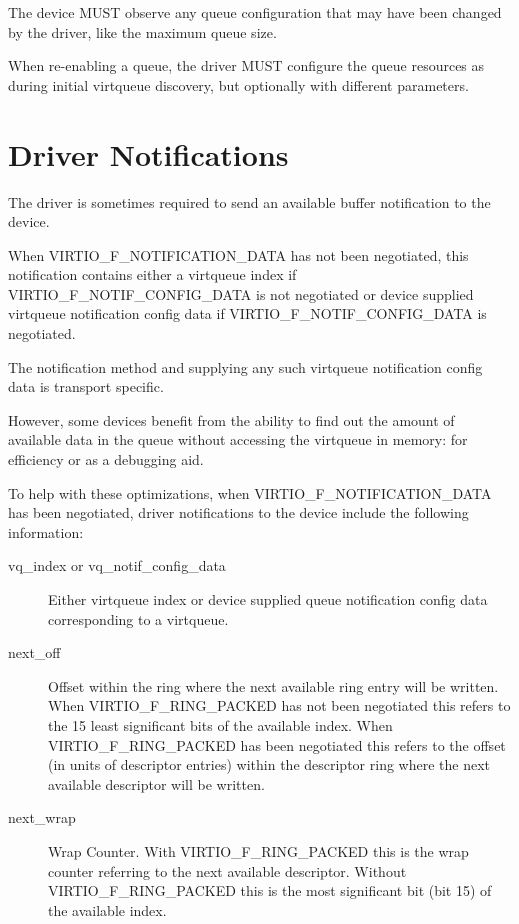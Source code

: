 The device MUST observe any queue configuration that may have been
changed by the driver, like the maximum queue size.


When re-enabling a queue, the driver MUST configure the queue resources
as during initial virtqueue discovery, but optionally with different
parameters.





\section{Driver Notifications} \label{sec:Basic Facilities of a Virtio Device / Driver notifications}
The driver is sometimes required to send an available buffer
notification to the device.

When VIRTIO_F_NOTIFICATION_DATA has not been negotiated,
this notification contains either a virtqueue index if
VIRTIO_F_NOTIF_CONFIG_DATA is not negotiated or device supplied virtqueue
notification config data if VIRTIO_F_NOTIF_CONFIG_DATA is negotiated.

The notification method and supplying any such virtqueue notification config data
is transport specific.

However, some devices benefit from the ability to find out the
amount of available data in the queue without accessing the virtqueue in memory:
for efficiency or as a debugging aid.

To help with these optimizations, when VIRTIO_F_NOTIFICATION_DATA
has been negotiated, driver notifications to the device include
the following information:

\begin{description}
\item [vq_index or vq_notif_config_data] Either virtqueue index or device
      supplied queue notification config data corresponding to a virtqueue.
\item [next_off] Offset
      within the ring where the next available ring entry
      will be written.
      When VIRTIO_F_RING_PACKED has not been negotiated this refers to the
      15 least significant bits of the available index.
      When VIRTIO_F_RING_PACKED has been negotiated this refers to the offset
      (in units of descriptor entries)
      within the descriptor ring where the next available
      descriptor will be written.
\item [next_wrap] Wrap Counter.
      With VIRTIO_F_RING_PACKED this is the wrap counter
      referring to the next available descriptor.
      Without VIRTIO_F_RING_PACKED this is the most significant bit
      (bit 15) of the available index.
\end{description}

